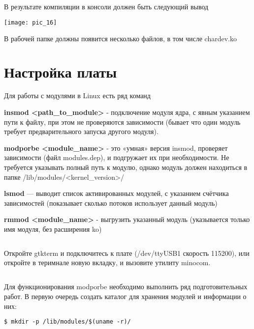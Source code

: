 \subsection{}В результате компиляции в консоли должен быть следующий вывод
\begin{center}
	\texttt{[image: pic\_16]}
\end{center}
В рабочей папке должны появится несколько файлов, в том числе chardev.ko

\section{Настройка платы}
Для работы с модулями в Linux есть ряд команд

\textbf{insmod <path\_to\_module>} - подключение модуля ядра, с явным указанием пути к файлу, при этом не проверяются зависимости (бывает что один модуль требует предварительного запуска другого модуля).

\textbf{modporbe <module\_name>} - это «умная» версия insmod, проверяет зависимости (файл modules.dep), и подгружает их при необходимости. Не требуется указывать полный путь к модулю, однако модуль должен находиться в папке  /lib/modules/<kernel\_version>/

\textbf{lsmod} — выводит список активированных модулей, с указанием счётчика зависимостей (показывает сколько потоков использует данный модуль)

\textbf{rmmod <module\_name>} - выгрузить указанный модуль (указывается только имя модуля, без расширения ko)

\subsection{}Откройте gtkterm и подключитесь к плате (/dev/ttyUSB1 скорость 115200), или откройте в теримнале новую вкладку, и вызовите утилиту minocom.

\subsection{}Для функционирования modporbe необходимо выполнить ряд подготовительных работ. В первую очередь создать каталог для хранения модулей и информации о них:
\begin{lstlisting}[style=bash]
$ mkdir -p /lib/modules/$(uname -r)/
\end{lstlisting}

